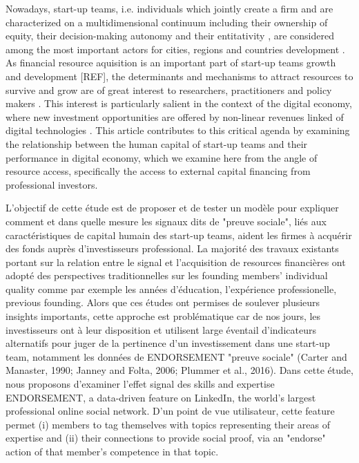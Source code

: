 \documentclass[12pt]{article}
\begin{document}
Nowadays, start-up teams, i.e. individuals which jointly create a firm and are characterized on a multidimensional continuum including their ownership of equity, their decision-making autonomy and their entitativity \citep{kamm1990entrepreneurial, knight2020start}, are considered among the most important actors for cities, regions and countries development \citep{audretsch2001linking, autio2016entrepreneurship}. As financial resource aquisition is an important part of start-up teams growth and development [REF], the determinants and mechanisms to attract resources to survive and grow are of great interest to researchers, practitioners and policy makers \citep{EUcommission2015digital}. This interest is particularly salient in the context of the digital economy, where new investment opportunities are offered by non-linear revenues linked of digital technologies \citep{nambisan2017digital, sahut2021age}. This article contributes to this critical agenda by examining the relationship between the human capital of start-up teams and their performance in digital economy, which we examine here from the angle of resource access, specifically the access to external capital financing from professional investors.

L'objectif de cette étude est de proposer et de tester un modèle pour expliquer comment et dans quelle mesure les signaux dits de "preuve sociale", liés aux caractéristiques de capital humain des start-up teams, aident les firmes à acquérir des fonds auprès d'investisseurs professional. La majorité des travaux existants portant sur la relation entre le signal et l'acquisition de resources financières ont adopté des perspectives traditionnelles sur les founding members' individual quality comme par exemple les années d'éducation, l'expérience professionelle, previous founding. Alors que ces études ont permises de soulever plusieurs insights importants, cette approche est problématique car de nos jours, les investisseurs ont à leur disposition et utilisent large éventail d'indicateurs alternatifs pour juger de la pertinence d'un investissement dans une start-up team, notamment les données de ENDORSEMENT "preuve sociale" (Carter and Manaster, 1990; Janney and Folta, 2006; Plummer et al., 2016). Dans cette étude, nous proposons d'examiner l'effet signal des skills and expertise ENDORSEMENT, a data-driven feature on LinkedIn, the world's largest professional online social network. D'un point de vue utilisateur, cette feature permet (i) members to tag themselves with topics representing their areas of expertise and (ii) their connections to provide social proof, via an "endorse" action of that member's competence in that topic.
\end{document}
